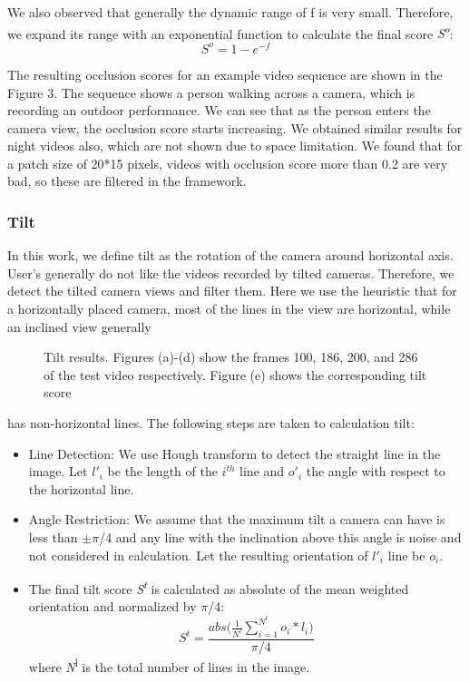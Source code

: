 \documentclass{sig-alternate}
\begin{document}
We also observed that generally the dynamic range of f is very
small. Therefore, we expand its range with an exponential function
to calculate the final score \textit{S\textsuperscript{o}}:
\begin{equation}
S^o = 1-e^{-f}
\end{equation}

The resulting occlusion scores for an example video sequence are shown in the Figure 3. The sequence shows a person walking across a camera, which is recording an outdoor performance. We can see that as the person enters the camera view, the occlusion score starts increasing. We obtained similar results for night videos also, which are not shown due to space limitation. We found that for a patch size of 20*15 pixels, videos with occlusion score more than 0.2 are very bad, so these are filtered in the framework.

\subsubsection{Tilt}
In this work, we define tilt as the rotation of the camera around
horizontal axis. User’s generally do not like the videos recorded
by tilted cameras. Therefore, we detect the tilted camera views
and filter them. Here we use the heuristic that for a horizontally
placed camera, most of the lines in the view are horizontal, while
an inclined view generally 
\begin{figure}
\centering
{}
\caption{Tilt results. Figures (a)-(d) show the frames 100, 186,
200, and 286 of the test video respectively. Figure (e) shows the
corresponding tilt score}
\end{figure}
has non-horizontal lines. The following
steps are taken to calculation tilt:
\begin{itemize}
\item Line Detection: We use Hough transform to detect the straight line in the image. Let $l'_i$ be the length of the $i^{th}$ line and $o'_i$ the angle with respect to the horizontal line.
\item  Angle Restriction: We assume that the maximum tilt a camera can have is less than $\pm\pi$/4 and any line with the inclination above this angle is noise and not considered in calculation. Let the resulting orientation of $l'_i$ line be $o_i$.
\item The final tilt score \textit{S\textsuperscript{t}} is calculated as absolute of the mean
weighted orientation and normalized by $\pi$/4:
\begin{equation}
    S^t=\frac{abs\bigg(\frac{1}{N^l}\sum_{i=1}^{N^l} o_i*l_i\bigg)}{\pi/4}
\end{equation}
where \textit N{\textsuperscript{l}} is the total number of lines in the image.
\end{itemize}
\end{document}
